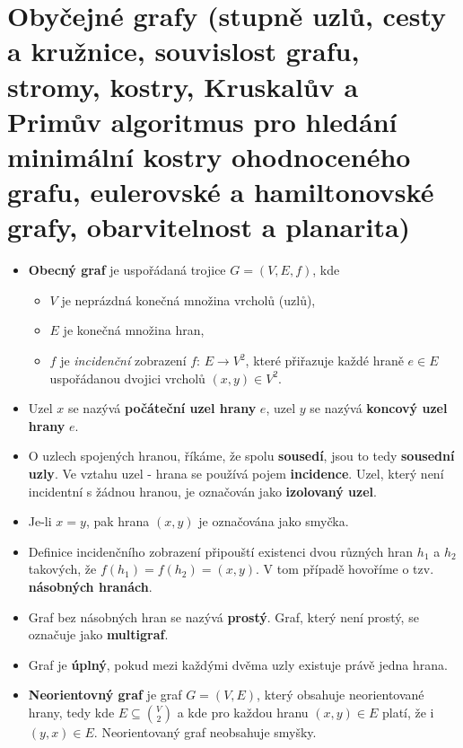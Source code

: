 \documentclass[11pt,a4paper]{article}
\begin{document}
\section{Obyčejné grafy (stupně uzlů, cesty a kružnice, souvislost grafu, stromy, kostry, Kruskalův a Primův algoritmus pro hledání minimální kostry ohodnoceného grafu, eulerovské a hamiltonovské grafy, obarvitelnost a planarita)}

\begin{itemize}
\item \textbf{Obecný graf} je uspořádaná trojice $G = (V, E, f)$, kde
\begin{itemize}
\item $V$ je neprázdná konečná množina vrcholů (uzlů),
\item $E$ je konečná množina hran,
\item $f$ je \textit{incidenční} zobrazení $f$: $E \rightarrow V^2$, které přiřazuje každé hraně $e \in E$ uspořádanou dvojici vrcholů $(x,y) \in V^2$.
\end{itemize}

\item Uzel $x$ se nazývá \textbf{počáteční uzel hrany} $e$, uzel $y$ se nazývá \textbf{koncový uzel hrany} $e$.

\item O uzlech spojených hranou, říkáme, že spolu \textbf{sousedí}, jsou to tedy \textbf{sousední uzly}. Ve vztahu uzel - hrana se používá pojem \textbf{incidence}. Uzel, který není incidentní s žádnou hranou, je označován jako \textbf{izolovaný uzel}.

\item Je-li $x = y$, pak hrana $(x, y)$ je označována jako smyčka.

\item Definice incidenčního zobrazení připouští existenci dvou různých hran $h_1$ a $h_2$ takových, že $f(h_1) = f(h_2) = (x,y)$. V tom případě hovoříme o tzv. \textbf{násobných hranách}.

\item Graf bez násobných hran se nazývá \textbf{prostý}. Graf, který není prostý, se označuje jako \textbf{multigraf}. 

\item Graf je \textbf{úplný}, pokud mezi každými dvěma uzly existuje právě jedna hrana.

\item \textbf{Neorientovný graf} je graf $G = (V, E)$, který obsahuje neorientované hrany, tedy kde $E \subseteq {V \choose 2}$ a kde pro každou hranu $(x, y) \in E$ platí, že i $(y, x) \in E$. Neorientovaný graf neobsahuje smyšky.


\end{itemize}
\end{document}
